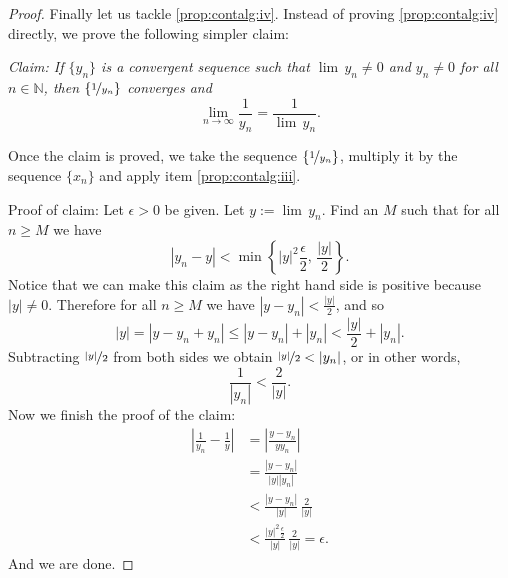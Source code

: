 \documentclass[12pt]{book}
\newcommand{\abs}[1]{\left\lvert {#1} \right\rvert}
\newcommand{\N}{{\mathbb{N}}}
\theoremstyle{plain}
\theoremstyle{remark}
\theoremstyle{definition}
\theoremstyle{exercise}
\theoremstyle{example}
\begin{document}
\begin{proof}
Finally let us tackle
\ref{prop:contalg:iv}.  Instead of proving 
\ref{prop:contalg:iv} directly, we prove the following simpler claim:

\emph{Claim: If $\{ y_n \}$ is a convergent sequence such that
$\lim\, y_n \not= 0$ and $y_n \not= 0$ for all $n \in \N$, then
$\{ \nicefrac{1}{y_n} \}$ converges and}
\begin{equation*}
\lim_{n\to\infty} \frac{1}{y_n} = \frac{1}{\lim\, y_n}  .
\end{equation*}

Once the claim is proved, we take the sequence $\{ \nicefrac{1}{y_n} \}$,
multiply it by the sequence $\{ x_n \}$ and apply item
\ref{prop:contalg:iii}.

Proof of claim:  Let $\epsilon > 0$ be given.
Let $y := \lim\, y_n$.
Find an $M$ such that for all $n \geq M$
we have
\begin{equation*}
\abs{y_n - y} < \min \left\{ \abs{y}^2\frac{\epsilon}{2}, \, \frac{\abs{y}}{2}
\right\} .
\end{equation*}
Notice that we can make this claim as the right hand side is positive
because $\abs{y} \not= 0$.  Therefore for all $n \geq M$ we have
$\abs{y - y_n} < \frac{\abs{y}}{2}$, and so
\begin{equation*}
\abs{y} = 
\abs{y - y_n + y_n } \leq
\abs{y - y_n} + \abs{ y_n } < \frac{\abs{y}}{2} + \abs{y_n}.
\end{equation*}
Subtracting $\nicefrac{\abs{y}}{2}$ from both sides we obtain
$\nicefrac{\abs{y}}{2} < \abs{y_n}$, or in other words,
\begin{equation*}
\frac{1}{\abs{y_n}} < \frac{2}{\abs{y}} .
\end{equation*}
Now we finish the proof of the claim:
\begin{equation*}
\begin{split}
\abs{\frac{1}{y_n} - \frac{1}{y}} &=
\abs{\frac{y - y_n}{y y_n}} \\
& =
\frac{\abs{y - y_n}}{\abs{y} \abs{y_n}} \\
& <
\frac{\abs{y - y_n}}{\abs{y}} \, \frac{2}{\abs{y}} \\
& <
\frac{\abs{y}^2 \frac{\epsilon}{2}}{\abs{y}} \, \frac{2}{\abs{y}}
= \epsilon .
\end{split}
\end{equation*}
And we are done.
\end{proof}
\end{document}
